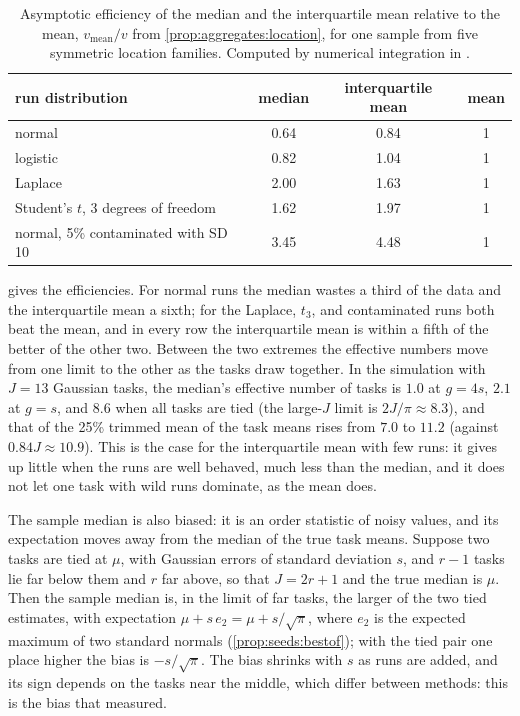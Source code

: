 \begin{refsection}
\begin{table}[t]
\centering\small
\begin{tabular}{lccc}
\toprule
run distribution & median & interquartile mean & mean\\
\midrule
normal & 0.64 & 0.84 & 1\\
logistic & 0.82 & 1.04 & 1\\
Laplace & 2.00 & 1.63 & 1\\
Student's $t$, 3 degrees of freedom & 1.62 & 1.97 & 1\\
normal, 5\% contaminated with SD 10 & 3.45 & 4.48 & 1\\
\bottomrule
\end{tabular}
\caption{Asymptotic efficiency of the median and the interquartile mean relative to the mean, $v_{\mathrm{mean}}/v$ from \cref{prop:aggregates:location}, for one sample from five symmetric location families. Computed by numerical integration in .}\label{tab:aggregates:efficiency}
\end{table}

 gives the efficiencies. For normal runs the median wastes a third of the data and the interquartile mean a sixth; for the Laplace, $t_3$, and contaminated runs both beat the mean, and in every row the interquartile mean is within a fifth of the better of the other two. Between the two extremes the effective numbers move from one limit to the other as the tasks draw together. In the simulation with $J=13$ Gaussian tasks, the median's effective number of tasks is $1.0$ at $g=4s$, $2.1$ at $g=s$, and $8.6$ when all tasks are tied (the large-$J$ limit is $2J/\pi\approx8.3$), and that of the 25\% trimmed mean of the task means rises from $7.0$ to $11.2$ (against $0.84J\approx10.9$). This is the case for the interquartile mean with few runs: it gives up little when the runs are well behaved, much less than the median, and it does not let one task with wild runs dominate, as the mean does.

The sample median is also biased: it is an order statistic of noisy values, and its expectation moves away from the median of the true task means. Suppose two tasks are tied at $\mu$, with Gaussian errors of standard deviation $s$, and $r-1$ tasks lie far below them and $r$ far above, so that $J=2r+1$ and the true median is $\mu$. Then the sample median is, in the limit of far tasks, the larger of the two tied estimates, with expectation $\mu+s\,e_2=\mu+s/\sqrt\pi$, where $e_2$ is the expected maximum of two standard normals (\cref{prop:seeds:bestof}); with the tied pair one place higher the bias is $-s/\sqrt\pi$. The bias shrinks with $s$ as runs are added, and its sign depends on the tasks near the middle, which differ between methods: this is the bias that \textcite{AgarwalEtAl2021} measured.


\end{refsection}
